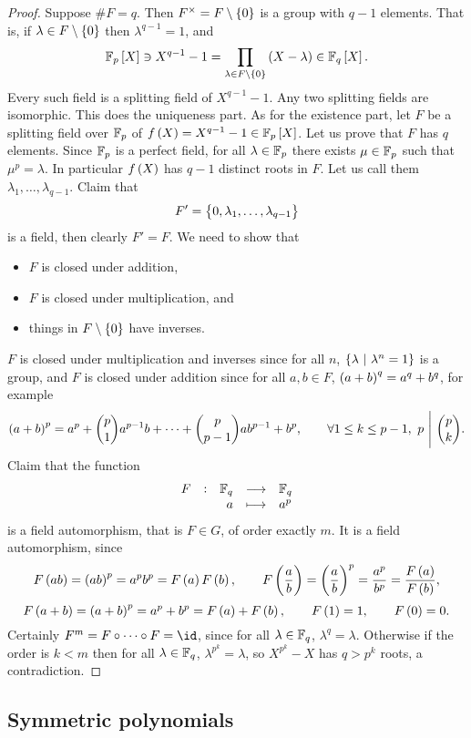 \begin{proof}
Suppose $ \#F = q $. Then $ F^\times = F \setminus \cbr{0} $ is a group with $ q - 1 $ elements. That is, if $ \lambda \in F \setminus \cbr{0} $ then $ \lambda^{q - 1} = 1 $, and
$$ \FF_p\sbr{X} \ni X^{q - 1} - 1 = \prod_{\lambda \in F \setminus \cbr{0}} \br{X - \lambda} \in \FF_q\sbr{X}. $$
Every such field is a splitting field of $ X^{q - 1} - 1 $. Any two splitting fields are isomorphic. This does the uniqueness part. As for the existence part, let $ F $ be a splitting field over $ \mathbb{F}_p $ of $ f\br{X} = X^{q - 1} - 1 \in \FF_p\sbr{X} $. Let us prove that $ F $ has $ q $ elements. Since $ \mathbb{F}_p $ is a perfect field, for all $ \lambda \in \mathbb{F}_p $ there exists $ \mu \in \mathbb{F}_p $ such that $ \mu^p = \lambda $. In particular $ f\br{X} $ has $ q - 1 $ distinct roots in $ F $. Let us call them $ \lambda_1, \dots, \lambda_{q - 1} $. Claim that
$$ F' = \cbr{0, \lambda_1, \dots, \lambda_{q - 1}} $$
is a field, then clearly $ F' = F $. We need to show that
\begin{itemize}
\item $ F $ is closed under addition,
\item $ F $ is closed under multiplication, and
\item things in $ F \setminus \cbr{0} $ have inverses.
\end{itemize}
$ F $ is closed under multiplication and inverses since for all $ n $, $ \cbr{\lambda \st \lambda^n = 1} $ is a group, and $ F $ is closed under addition since for all $ a, b \in F $, $ \br{a + b}^q = a^q + b^q $, for example
$$ \br{a + b}^p = a^p + \binom{p}{1}a^{p - 1}b + \dots + \binom{p}{p - 1}ab^{p - 1} + b^p, \qquad \forall 1 \le k \le p - 1, \ p \ \Bigg| \ \binom{p}{k}. $$
Claim that the function
$$ \function[F]{\FF_q}{\FF_q}{a}{a^p} $$
is a field automorphism, that is $ F \in G $, of order exactly $ m $. It is a field automorphism, since
$$ F\br{ab} = \br{ab}^p = a^pb^p = F\br{a}F\br{b}, \qquad F\br{\dfrac{a}{b}} = \br{\dfrac{a}{b}}^p = \dfrac{a^p}{b^p} = \dfrac{F\br{a}}{F\br{b}}, $$
$$ F\br{a + b} = \br{a + b}^p = a^p + b^p = F\br{a} + F\br{b}, \qquad F\br{1} = 1, \qquad F\br{0} = 0. $$
Certainly $ F^m = F \circ \dots \circ F = \id $, since for all $ \lambda \in \mathbb{F}_q $, $ \lambda^q = \lambda $. Otherwise if the order is $ k < m $ then for all $ \lambda \in \mathbb{F}_q $, $ \lambda^{p^k} = \lambda $, so $ X^{p^k} - X $ has $ q > p^k $ roots, a contradiction.
\end{proof}

\subsection{Symmetric polynomials}

